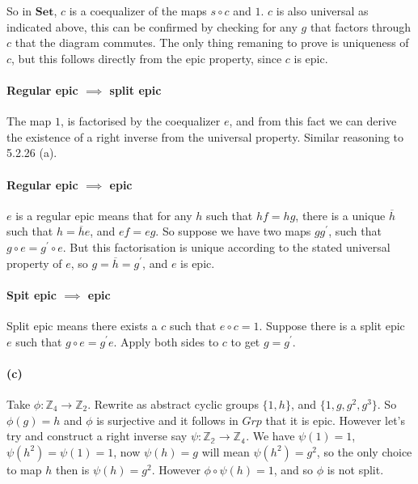 \documentclass{article}
\begin{document}
So in $\mathbf{Set}$, $c$ is a coequalizer of the maps $s\circ c$ and $1$. $c$ is also universal as indicated above, this can be confirmed by checking for any $g$ that factors through $c$ that the diagram commutes. The only thing remaning to prove is uniqueness of $c$, but this follows directly from the epic property, since $c$ is epic.

\paragraph{Regular epic $\implies$ split epic}

The map $1$, is factorised by the coequalizer $e$, and from this fact we can derive the existence of a right inverse from the universal property. Similar reasoning to 5.2.26 (a).

\paragraph{Regular epic $\implies$ epic}

$e$ is a regular epic means that for any $h$ such that $hf = hg$, there is a unique $\overline{h}$ such that $h = \overline{h}e$, and $ef = eg$. So suppose we have two maps $g g^\prime$, such that $g\circ e = g^\prime \circ e$. But this factorisation is unique according to the stated universal property of $e$, so $g = \overline{h} = g^\prime$, and $e$ is epic.

\paragraph{Spit epic $\implies$ epic}

Split epic means there exists a $c$ such that $e \circ c=1$. Suppose there is a split epic $e$ such that $g \circ e = g^\prime e$. Apply both sides to $c$ to get $g = g^\prime$.

\paragraph{(c)}

Take $\phi\colon \mathds{Z}_4 \rightarrow \mathds{Z}_2$. Rewrite as abstract cyclic groups $\{1, h\}$, and $\{1, g, g^2, g^3\}$. So $\phi(g)=h$ and $\phi$ is surjective and it follows in $Grp$ that it is epic. However let's try and construct a right inverse say $\psi: \mathds{Z_2} \rightarrow \mathds{Z_4}$. We have $\psi(1)=1$, $\psi(h^2)=\psi(1)=1$, now $\psi(h)=g$ will mean $\psi(h^2) = g^2$, so the only choice to map $h$ then is $\psi(h)=g^2$.  However $\phi \circ \psi (h) = 1$, and so $\phi$ is not split.
\end{document}
